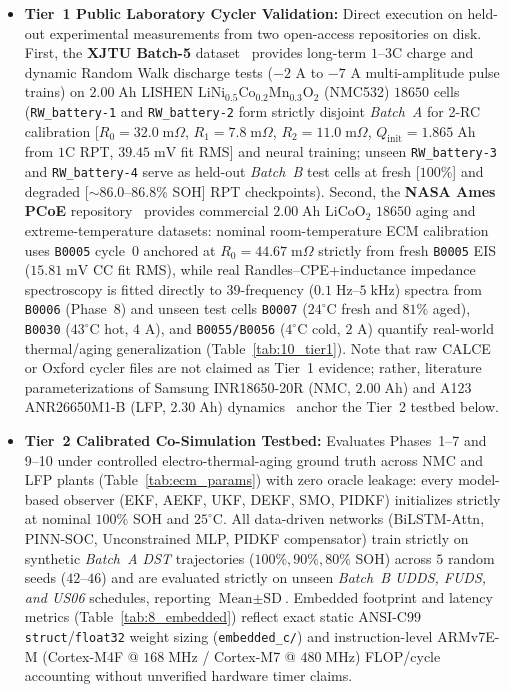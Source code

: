 \documentclass[11pt,a4paper]{article}
\begin{document}
\begin{itemize}
\item \textbf{Tier~1 Public Laboratory Cycler Validation:} Direct execution on held-out experimental measurements from two open-access repositories on disk. First, the \textbf{XJTU Batch-5} dataset~\cite{Wang2024xjtu} provides long-term $1\text{--}3\text{C}$ charge and dynamic Random Walk discharge tests ($-2\text{ A}$ to $-7\text{ A}$ multi-amplitude pulse trains) on $2.00\;\mathrm{Ah}$ LISHEN $\text{LiNi}_{0.5}\text{Co}_{0.2}\text{Mn}_{0.3}\text{O}_2$ (NMC532) $18650$ cells (\texttt{RW\_battery-1} and \texttt{RW\_battery-2} form strictly disjoint \emph{Batch~A} for 2-RC calibration [$R_0 = 32.0\;\mathrm{m}\Omega$, $R_1 = 7.8\;\mathrm{m}\Omega$, $R_2 = 11.0\;\mathrm{m}\Omega$, $Q_{\text{init}} = 1.865\;\mathrm{Ah}$ from $1\text{C}$ RPT, $39.45\;\mathrm{mV}$ fit RMS] and neural training; unseen \texttt{RW\_battery-3} and \texttt{RW\_battery-4} serve as held-out \emph{Batch~B} test cells at fresh [$100\%$] and degraded [$\sim 86.0\text{--}86.8\%$ SOH] RPT checkpoints). Second, the \textbf{NASA Ames PCoE} repository~\cite{Saha2007nasa} provides commercial $2.00\;\mathrm{Ah}$ $\text{LiCoO}_2$ $18650$ aging and extreme-temperature datasets: nominal room-temperature ECM calibration uses \texttt{B0005} cycle~0 anchored at $R_0 = 44.67\;\mathrm{m}\Omega$ strictly from fresh \texttt{B0005} EIS ($15.81\;\mathrm{mV}$ CC fit RMS), while real Randles--CPE+inductance impedance spectroscopy is fitted directly to $39$-frequency ($0.1\;\mathrm{Hz}\text{--}5\;\mathrm{kHz}$) spectra from \texttt{B0006} (Phase~8) and unseen test cells \texttt{B0007} ($24^\circ\text{C}$ fresh and $81\%$ aged), \texttt{B0030} ($43^\circ\text{C}$ hot, $4\text{ A}$), and \texttt{B0055/B0056} ($4^\circ\text{C}$ cold, $2\text{ A}$) quantify real-world thermal/aging generalization (Table~\ref{tab:10_tier1}). Note that raw CALCE or Oxford cycler files are not claimed as Tier~1 evidence; rather, literature parameterizations of Samsung INR18650-20R (NMC, $2.00\;\mathrm{Ah}$) and A123 ANR26650M1-B (LFP, $2.30\;\mathrm{Ah}$) dynamics~\cite{He2011ecm,Hu2012ecm,Birkl2017diagnostics,Pecht2011calce} anchor the Tier~2 testbed below.
\item \textbf{Tier~2 Calibrated Co-Simulation Testbed:} Evaluates Phases~1--7 and 9--10 under controlled electro-thermal-aging ground truth across NMC and LFP plants (Table~\ref{tab:ecm_params}) with zero oracle leakage: every model-based observer (EKF, AEKF, UKF, DEKF, SMO, PIDKF) initializes strictly at nominal $100\%$ SOH and $25^\circ\text{C}$. All data-driven networks (BiLSTM-Attn, PINN-SOC, Unconstrained MLP, PIDKF compensator) train strictly on synthetic \emph{Batch~A DST} trajectories ($100\%, 90\%, 80\%$ SOH) across $5$ random seeds ($42\text{--}46$) and are evaluated strictly on unseen \emph{Batch~B UDDS, FUDS, and US06} schedules, reporting $\text{Mean}\pm\text{SD}$. Embedded footprint and latency metrics (Table~\ref{tab:8_embedded}) reflect exact static ANSI-C99 \texttt{struct}/\texttt{float32} weight sizing (\texttt{embedded\_c/}) and instruction-level ARMv7E-M (Cortex-M4F @ $168\;\mathrm{MHz}$ / Cortex-M7 @ $480\;\mathrm{MHz}$) FLOP/cycle accounting without unverified hardware timer claims.
\end{itemize}
\end{document}
